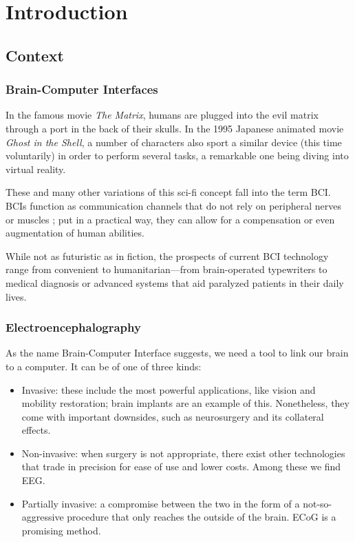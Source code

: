 \chapter{Introduction}\label{ch:introduction}

\section{Context}

	\subsection{Brain-Computer Interfaces}

		In the famous movie \textit{The Matrix}, humans are plugged into the evil matrix through a port in the back of their skulls. In the 1995 Japanese animated movie \textit{Ghost in the Shell}, a number of characters also sport a similar device (this time voluntarily) in order to perform several tasks, a remarkable one being diving into virtual reality.

		These and many other variations of this sci-fi concept fall into the term \ac{BCI}. \acs{BCI}s function as communication channels that do not rely on peripheral nerves or muscles \cite{bcidef}; put in a practical way, they can allow for a compensation or even augmentation of human abilities.

		While not as futuristic as in fiction, the prospects of current \acs{BCI} technology range from convenient to humanitarian---from brain-operated typewriters to medical diagnosis or advanced systems that aid paralyzed patients in their daily lives.

	\subsection{Electroencephalography}

		As the name Brain-Computer Interface suggests, we need a tool to link our brain to a computer. It can be of one of three kinds:

		\begin{itemize}

			\item
			Invasive: these include the most powerful applications, like vision and mobility restoration; brain implants are an example of this. Nonetheless, they come with important downsides, such as neurosurgery and its collateral effects.
			\item
			Non-invasive: when surgery is not appropriate, there exist other technologies that trade in precision for ease of use and lower costs. Among these we find \ac{EEG}.
			\item
			Partially invasive: a compromise between the two in the form of a not-so-aggressive procedure that only reaches the outside of the brain. \ac{ECoG} is a promising method.

		\end{itemize}

